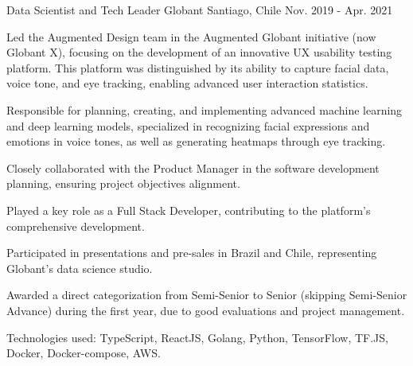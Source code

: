 \begin{cventries}

  \cventry
    {Data Scientist and Tech Leader} %
    {Globant} %
    {Santiago, Chile} %
    {Nov. 2019 - Apr. 2021} %
    {
      \begin{cvitems} %
        \item {Led the Augmented Design team in the Augmented Globant initiative (now Globant X), focusing on the development of an innovative UX usability testing platform. This platform was distinguished by its ability to capture facial data, voice tone, and eye tracking, enabling advanced user interaction statistics.}
        \item {Responsible for planning, creating, and implementing advanced machine learning and deep learning models, specialized in recognizing facial expressions and emotions in voice tones, as well as generating heatmaps through eye tracking.}
        \item {Closely collaborated with the Product Manager in the software development planning, ensuring project objectives alignment.}
        \item {Played a key role as a Full Stack Developer, contributing to the platform's comprehensive development.}
        \item {Participated in presentations and pre-sales in Brazil and Chile, representing Globant's data science studio.}
        \item {Awarded a direct categorization from Semi-Senior to Senior (skipping Semi-Senior Advance) during the first year, due to good evaluations and project management.}
        \item {Technologies used: TypeScript, ReactJS, Golang, Python, TensorFlow, TF.JS, Docker, Docker-compose, AWS.}
      \end{cvitems}
    }


\end{cventries}

